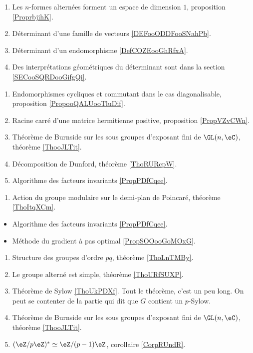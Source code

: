     \begin{enumerate}
    \item
        Les \( n\)-formes alternées forment un espace de dimension \( 1\), proposition \ref{ProprbjihK}.
    \item
        Déterminant d'une famille de vecteurs \ref{DEFooODDFooSNahPb}.
    \item
        Déterminant d'un endomorphisme \ref{DefCOZEooGhRfxA}.
        \item
            Des interprétations géométriques du déterminant sont dans la section \ref{SECooSQRDooGifgQi}.
        \end{enumerate}

    \begin{enumerate}
    \item Endomorphismes cycliques et commutant dans le cas diagonalisable, proposition \ref{PropooQALUooTluDif}.
    \item Racine carré d'une matrice hermitienne positive, proposition \ref{PropVZvCWn}.
    \item Théorème de Burnside sur les sous groupes d'exposant fini de \( \GL(n,\eC)\), théorème \ref{ThooJLTit}.
    \item Décomposition de Dunford, théorème \ref{ThoRURcpW}. 
    \item Algorithme des facteurs invariants \ref{PropPDfCqee}.
    \end{enumerate}

    \begin{enumerate}
    \item Action du groupe modulaire sur le demi-plan de Poincaré, théorème \ref{ThoItqXCm}. 
    \end{enumerate}

\begin{itemize}
    \item Algorithme des facteurs invariants \ref{PropPDfCqee}.
    \item Méthode du gradient à pas optimal \ref{PropSOOooGoMOxG}.
\end{itemize}

\begin{enumerate}
    \item Structure des groupes d'ordre \( pq\), théorème \ref{ThoLnTMBy}.
    \item Le groupe alterné est simple, théorème \ref{ThoURfSUXP}.
    \item Théorème de Sylow \ref{ThoUkPDXf}. Tout le théorème, c'est un peu long. On peut se contenter de la partie qui dit que \( G\) contient un \( p\)-Sylow.
    \item Théorème de Burnside sur les sous groupes d'exposant fini de \( \GL(n,\eC)\), théorème \ref{ThooJLTit}.
    \item \( (\eZ/p\eZ)^*\simeq \eZ/(p-1)\eZ\), corollaire \ref{CorpRUndR}.
\end{enumerate}

